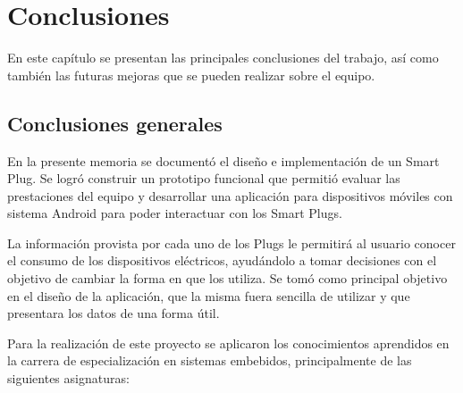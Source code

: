 
\chapter{Conclusiones} %

\label{Chapter5} %

En este capítulo se presentan las principales conclusiones del trabajo, así como también las futuras mejoras que se pueden realizar sobre el equipo.


\section{Conclusiones generales}

En la presente memoria se documentó el diseño e implementación de un Smart Plug. Se logró construir un prototipo funcional que permitió evaluar las prestaciones del equipo y desarrollar una aplicación para dispositivos móviles con sistema Android para poder interactuar con los Smart Plugs. 

La información provista por cada uno de los Plugs le permitirá al usuario conocer el consumo de los dispositivos eléctricos, ayudándolo a tomar decisiones con el objetivo de cambiar la forma en que los utiliza. Se tomó como principal objetivo en el diseño de la aplicación, que la misma fuera sencilla de utilizar y que presentara los datos de una forma útil.

Para la realización de este proyecto se aplicaron los conocimientos aprendidos en la carrera de especialización en sistemas embebidos, principalmente de las siguientes asignaturas:

